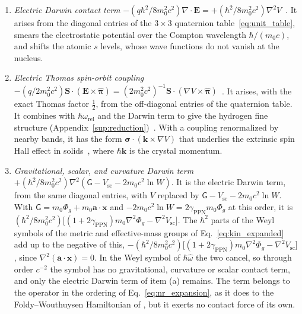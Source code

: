 \documentclass[aps,prd,onecolumn,tightenlines,nofootinbib,notitlepage,11pt,floatfix]{revtex4-2}
\theoremstyle{indentedtheorem}
\begin{document}
\begin{enumerate}[label=(\alph*)]
\item \emph{Electric Darwin contact term} $-(q\hbar^2/8m_0^2c^2)\nabla\cdot\mathbf{E} = +(\hbar^2/8m_0^2c^2)\nabla^2 V$~\citep{Darwin1928Wave,Foldy1950Dirac}. It arises from the diagonal entries of the $3\times 3$ quaternion table~\eqref{eq:unit_table}, smears the electrostatic potential over the Compton wavelength $\hbar/(m_0c)$, and shifts the atomic $s$ levels, whose wave functions do not vanish at the nucleus.
\item \emph{Electric Thomas spin-orbit coupling} $-(q/2m_0^2c^2)\mathbf{S}\cdot(\mathbf{E}\times\hat{\boldsymbol{\pi}}) = (2m_0^2c^2)^{-1}\mathbf{S}\cdot(\nabla V\times\hat{\boldsymbol{\pi}})$~\citep{Thomas1926Motion,Dirac1928Quantum,Foldy1950Dirac}. It arises, with the exact Thomas factor $\tfrac{1}{2}$, from the off-diagonal entries of the quaternion table. It combines with $\hbar\omega_\text{rel}$ and the Darwin term to give the hydrogen fine structure (Appendix~\ref{sup:reduction})~\citep{Darwin1928Wave,Sakurai2020Modern}. With a coupling renormalized by nearby bands, it has the form $\boldsymbol{\sigma}\cdot(\mathbf{k}\times\nabla V)$ that underlies the extrinsic spin Hall effect in solids~\citep{Sinova2015Spin}, where $\hbar\mathbf{k}$ is the crystal momentum.
\item \emph{Gravitational, scalar, and curvature Darwin term}~\citep{ObukhovSilenkoTeryaev2009Spin,ObukhovSilenkoTeryaev2011Dirac} $+(\hbar^2/8m_0^2c^2)\nabla^2(\mathsf{G}-V_\text{sc}-2m_0c^2\ln W)$. It is the electric Darwin term, from the same diagonal entries, with $V$ replaced by $\mathsf{G}-V_\text{sc}-2m_0c^2\ln W$. With $\mathsf{G}=m_0\Phi_g+m_0\mathbf{a}\cdot\mathbf{x}$ and $-2m_0c^2\ln W = 2\gamma_\text{PPN}m_0\Phi_g$ at this order, it is $(\hbar^2/8m_0^2c^2)\big[(1+2\gamma_\text{PPN})m_0\nabla^2\Phi_g - \nabla^2V_\text{sc}\big]$. The $\hbar^2$ parts of the Weyl symbols of the metric and effective-mass groups of Eq.~\eqref{eq:kin_expanded} add up to the negative of this, $-(\hbar^2/8m_0^2c^2)\big[(1+2\gamma_\text{PPN})m_0\nabla^2\Phi_g - \nabla^2V_\text{sc}\big]$, since $\nabla^2(\mathbf{a}\cdot\mathbf{x})=0$. In the Weyl symbol of $\hbar\hat{\omega}$ the two cancel, so through order $c^{-2}$ the symbol has no gravitational, curvature or scalar contact term, and only the electric Darwin term of item (a) remains. The term belongs to the operator in the ordering of Eq.~\eqref{eq:nr_expansion}, as it does to the Foldy--Wouthuysen Hamiltonian of \citet{ObukhovSilenkoTeryaev2011Dirac}, but it exerts no contact force of its own.

\end{enumerate}
\end{document}
